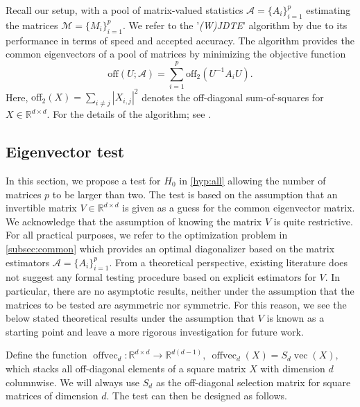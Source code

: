 \documentclass[12pt]{article}
\newcommand{\R}{\mathbb{R}}
\numberwithin{thm}{section}
\numberwithin{defn}{section}
\numberwithin{lem}{section}
\numberwithin{prop}{section}
\numberwithin{cor}{section}
\numberwithin{rem}{section}
\DeclareMathOperator{\Vector}{vec}
\DeclareMathOperator{\offvec}{offvec}
\begin{document}
Recall our setup, with a pool of matrix-valued statistics $\mathcal{A} = \{A_i\}_{i = 1}^p$ estimating the matrices $\mathcal{M} = \{M_i\}_{i = 1}^p$. We refer to the '\textit{(W)JDTE}' algorithm by \cite{andre} due to its performance in terms of speed and accepted accuracy. The algorithm provides the common eigenvectors of a pool of matrices by minimizing the objective function
\begin{equation}
    \text{off}(U; \mathcal{A}) = \sum_{i = 1}^p \text{off}_2(U^{-1} A_i U).
\end{equation}
Here, $\text{off}_2(X) = \sum_{i \ne j} |X_{i,j}|^2$ denotes the off-diagonal sum-of-squares for $X \in \mathbb{R}^{d \times d}$. For the details of the algorithm; see \cite{andre}.

\vspace{-0.5cm}
\subsection{Eigenvector test}\label{subsec:eigtest}
\vspace{-0.3cm}
In this section, we propose a test for $H_0$ in \eqref{hyp:all} allowing the number of matrices $p$ to be larger than two. The test is based on the assumption that an invertible matrix $V \in \R^{d \times d}$ is given as a guess for the common eigenvector matrix. 
We acknowledge that the assumption of knowing the matrix $V$ is quite restrictive. For all practical purposes, we refer to the optimization problem in \autoref{subsec:common} which provides an optimal diagonalizer based on the matrix estimators $\mathcal{A} = \{A_i\}_{i = 1}^p$.
From a theoretical perspective, existing literature does not suggest any formal testing procedure based on explicit estimators for $V$. In particular, there are no asymptotic results, neither under the assumption that the matrices to be tested are asymmetric nor symmetric. For this reason, we see the below stated theoretical results under the assumption that $V$ is known as a starting point and leave a more rigorous investigation for future work.


Define the function
$
\offvec_d: \R^{d \times d} \to \R^{d(d - 1)}, ~ \offvec_d(X) = S_d \Vector(X),
$
which stacks all off-diagonal elements of a square matrix $X$ with dimension $d$ columnwise. We will always use $S_d$ as the off-diagonal selection matrix for square matrices of dimension $d$. The test can then be designed as follows.
\end{document}
